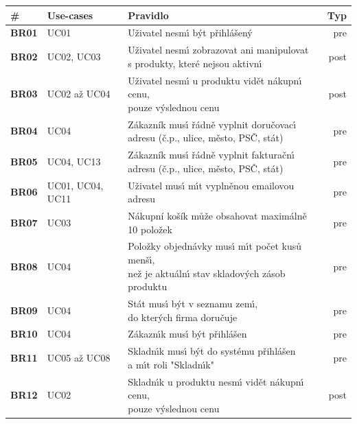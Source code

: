 \begin{table}
    \centering
    \begin{tabular}{ l l l r }
        \hline
        \textbf{\#} & \textbf{Use-cases} & \textbf{Pravidlo} & \textbf{Typ} \\ \hline \hline
        \textbf{BR01} & UC01 & Uživatel nesm\'{\i} b\'yt přihlášen\'y & pre \\ \hline
        \textbf{BR02} & UC02, UC03 & \makecell[l]{Uživatel nesm\'{\i} zobrazovat ani manipulovat \\ s produkty, které nejsou aktivn\'{\i}} & post \\ \hline
        \textbf{BR03} & UC02 až UC04 & \makecell[l]{Uživatel nesm\'{\i} u produktu vidět nákupn\'{\i} cenu, \\ pouze v\'yslednou cenu} & post \\ \hline
        \textbf{BR04} & UC04 & \makecell[l]{Zákazník mus\'{\i} řádně vyplnit doručovac\'{\i} \\ adresu (č.p., ulice, město, PSČ, stát)} & pre \\ \hline
        \textbf{BR05} & UC04, UC13 & \makecell[l]{Zákazník mus\'{\i} řádně vyplnit fakturačn\'{\i} \\ adresu (č.p., ulice, město, PSČ, stát)} & pre \\ \hline
        \textbf{BR06} & UC01, UC04, UC11 & Uživatel mus\'{\i} m\'{\i}t vyplněnou emailovou adresu & pre \\ \hline
        \textbf{BR07} & UC03 & Nákupní košík může obsahovat maximálně 10 položek & pre \\ \hline
        \textbf{BR08} & UC04 & \makecell[l]{Položky objednávky mus\'{\i} m\'{\i}t počet kusů menš\'{\i}, \\ než je aktuáln\'{\i} stav skladov\'ych zásob produktu} & pre \\ \hline
        \textbf{BR09} & UC04 & \makecell[l]{Stát mus\'{\i} b\'yt v seznamu zem\'{\i}, \\ do kter\'ych firma doručuje} & pre \\ \hline
        \textbf{BR10} & UC04 & Zákazn\'{\i}k mus\'{\i} b\'yt přihlášen & pre \\ \hline
        \textbf{BR11} & UC05 až UC08 & \makecell[l]{Skladn\'{\i}k mus\'{\i} b\'yt do systému přihlášen \\ a m\'{\i}t roli "Skladn\'{\i}k"} & pre \\ \hline
        \textbf{BR12} & UC02 & \makecell[l]{Skladn\'{\i}k u produktu nesm\'{\i} vidět nákupn\'{\i} cenu, \\ pouze v\'yslednou cenu} & post \\ \hline

\end{tabular}
\end{table}
